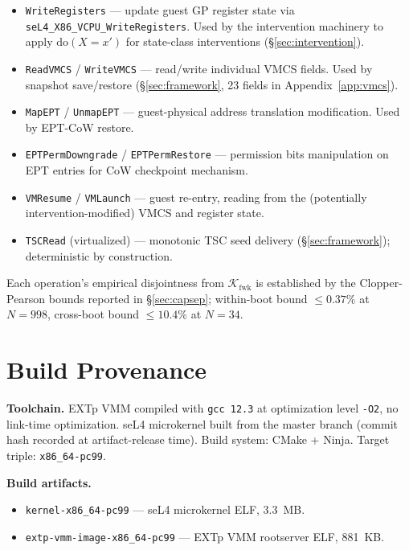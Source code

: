 \documentclass[conference]{IEEEtran}
\newcommand{\Kfwk}{\mathcal{K}_\text{fwk}}
\newcommand{\dox}[1]{\text{do}(X{=}#1)}
\begin{document}
\begin{itemize}[itemsep=2pt,topsep=2pt,leftmargin=*]
\item \texttt{WriteRegisters} --- update guest GP register state
  via \texttt{seL4\_X86\_VCPU\_WriteRegisters}. Used by the
  intervention machinery to apply $\dox{x'}$ for state-class
  interventions (\S\ref{sec:intervention}).
\item \texttt{ReadVMCS} / \texttt{WriteVMCS} --- read/write
  individual VMCS fields. Used by snapshot save/restore
  (\S\ref{sec:framework}, 23 fields in Appendix~\ref{app:vmcs}).
\item \texttt{MapEPT} / \texttt{UnmapEPT} --- guest-physical
  address translation modification. Used by EPT-CoW restore.
\item \texttt{EPTPermDowngrade} / \texttt{EPTPermRestore} ---
  permission bits manipulation on EPT entries for CoW
  checkpoint mechanism.
\item \texttt{VMResume} / \texttt{VMLaunch} --- guest re-entry,
  reading from the (potentially intervention-modified) VMCS and
  register state.
\item \texttt{TSCRead} (virtualized) --- monotonic TSC seed
  delivery (\S\ref{sec:framework}); deterministic by construction.
\end{itemize}

Each operation's empirical disjointness from $\Kfwk$ is established
by the Clopper-Pearson bounds reported in \S\ref{sec:capsep};
within-boot bound $\leq 0.37\%$ at $N{=}998$, cross-boot bound
$\leq 10.4\%$ at $N{=}34$.

\section{Build Provenance}\label{app:build}

\textbf{Toolchain.} EXTp VMM compiled with \texttt{gcc 12.3} at
optimization level \texttt{-O2}, no link-time optimization.
seL4 microkernel built from the master branch (commit hash
recorded at artifact-release time). Build system: CMake + Ninja. Target triple:
\texttt{x86\_64-pc99}.

\textbf{Build artifacts.}
\begin{itemize}[itemsep=2pt,topsep=2pt,leftmargin=*]
\item \texttt{kernel-x86\_64-pc99} --- seL4 microkernel ELF, 3.3~MB.
\item \texttt{extp-vmm-image-x86\_64-pc99} --- EXTp VMM rootserver
  ELF, 881~KB.
\end{itemize}
\end{document}
